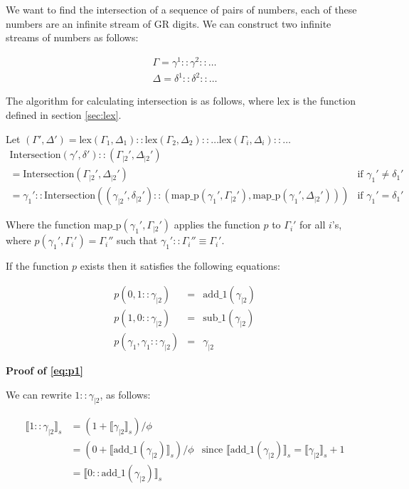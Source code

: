 \documentclass{cs4rep}
\begin{document}
We want to find the intersection of a sequence of pairs of numbers,
each of these numbers are an infinite stream of GR digits. We can
construct two infinite streams of numbers as follows:

\[ \begin{array}{l}
\Gamma = \gamma^{1}::\gamma^{2}::\ldots \\
\Delta = \delta^{1}::\delta^{2}::\ldots
\end{array} \]

The algorithm for calculating intersection is as follows, where lex is the function defined in section \ref{sec:lex}.

Let $(\Gamma',\Delta') = \mbox{lex}(\Gamma_{1},\Delta_{1}):: \mbox{lex}(\Gamma_{2},\Delta_{2})::\ldots\mbox{lex}(\Gamma_{i},\Delta_{i})::\dots $
\[ \begin{array}{ll}
\mbox{Intersection}(\gamma',\delta')::(\Gamma_{|2}',\Delta_{|2}') \\
= \mbox{Intersection}(\Gamma_{|2}', \Delta_{|2}') & \mbox{if } \gamma_{1}' \neq \delta_{1}' \\
= \gamma_{1}'::\mbox{Intersection}((\gamma_{|2}',\delta_{|2}')::(\mbox{map\_p}(\gamma_{1}', \Gamma_{|2}'), \mbox{map\_p}(\gamma_{1}',\Delta_{|2}'))) & \mbox{if } \gamma_{1}' = \delta_{1}'
\end{array} \]

Where the function $\mbox{map\_p}(\gamma_{1}', \Gamma_{|2}')$ applies the function $p$ to $\Gamma_{i}'$ for all $i$'s, where $p(\gamma_{1}',\Gamma_{i}')=\Gamma_{i}''$ such that $\gamma_{1}'::\Gamma_{i}'' \equiv \Gamma_{i}'$.

If the function $p$ exists then it satisfies the following equations:

\begin{eqnarray}
p(0,1::\gamma_{|2}) & = & \mbox{add\_1}(\gamma_{|2}) \label{eq:p1} \\
p(1,0::\gamma_{|2}) & = & \mbox{sub\_1}(\gamma_{|2}) \label{eq:p2} \\
p(\gamma_{1},\gamma_{1}::\gamma_{|2}) & = & \gamma_{|2} \label{eq:p3}
\end{eqnarray}

{\bf Proof of \ref{eq:p1}}

We can rewrite $1::\gamma_{|2}$, as follows:

\[ \begin{array}{lll}
\llbracket 1::\gamma_{|2} \rrbracket_{s} & = (1+ \llbracket \gamma_{|2} \rrbracket_{s})/ \phi \\
& = (0+ \llbracket \mbox{add\_1}(\gamma_{|2}) \rrbracket_{s})/\phi & \mbox{since } \llbracket \mbox{add\_1}(\gamma_{|2}) \rrbracket_{s} = \llbracket \gamma_{|2} \rrbracket_{s} + 1 \\
& = \llbracket 0::\mbox{add\_1}(\gamma_{|2}) \rrbracket_{s}
\end{array} \]
\end{document}
